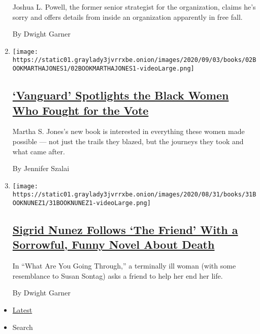 \begin{enumerate}
  Joshua L. Powell, the former senior strategist for the organization,
  claims he's sorry and offers details from inside an organization
  apparently in free fall.

  By Dwight Garner
\item
  \texttt{[image: https://static01.graylady3jvrrxbe.onion/images/2020/09/03/books/02BOOKMARTHAJONES1/02BOOKMARTHAJONES1-videoLarge.png]}

  \hypertarget{vanguard-spotlights-the-black-women-who-fought-for-the-vote}{%
  \subsection{\texorpdfstring{\href{/2020/09/02/books/review-vanguard-black-women-broke-barriers-won-vote-martha-s-jones.html}{`Vanguard'
  Spotlights the Black Women Who Fought for the
  Vote}}{`Vanguard' Spotlights the Black Women Who Fought for the Vote}}\label{vanguard-spotlights-the-black-women-who-fought-for-the-vote}}

  Martha S. Jones's new book is interested in everything these women
  made possible --- not just the trails they blazed, but the journeys
  they took and what came after.

  By Jennifer Szalai
\item
  \texttt{[image: https://static01.graylady3jvrrxbe.onion/images/2020/08/31/books/31BOOKNUNEZ1/31BOOKNUNEZ1-videoLarge.png]}

  \hypertarget{sigrid-nunez-follows-the-friend-with-a-sorrowful-funny-novel-about-death}{%
  \subsection{\texorpdfstring{\href{/2020/08/31/books/review-what-are-you-going-through-sigrid-nunez.html}{Sigrid
  Nunez Follows `The Friend' With a Sorrowful, Funny Novel About
  Death}}{Sigrid Nunez Follows `The Friend' With a Sorrowful, Funny Novel About Death}}\label{sigrid-nunez-follows-the-friend-with-a-sorrowful-funny-novel-about-death}}

  In ``What Are You Going Through,'' a terminally ill woman (with some
  resemblance to Susan Sontag) asks a friend to help her end her life.

  By Dwight Garner
\end{enumerate}

\begin{itemize}
\tightlist
\item
  \protect\hyperlink{stream-panel}{Latest}
\item
  Search
\end{itemize}


